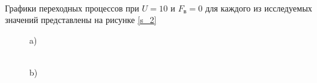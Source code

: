 \documentclass[a4paper,12pt]{article}
\begin{document}
	\paragraph {} Графики переходных процессов при $U=10$ и $F_{\text{в}}=0$ для каждого из исследуемых значений представлены на рисунке \ref{s_2}\\
	
	\begin{figure}[h!]
		\renewcommand{\figurename}{Рисунок}
		\begin{minipage}[h]{0.47\linewidth}
			 a) \\
		\end{minipage}
		\hfill
		\begin{minipage}[h]{0.47\linewidth}
			 \\b)

\end{minipage}
\end{figure}
\end{document}
